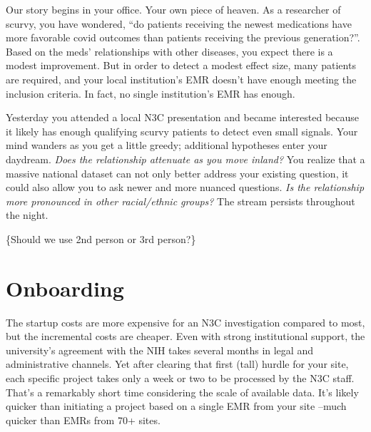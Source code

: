 \documentclass[
  letterpaper,
  DIV=11,
  numbers=noendperiod]{scrreprt}
\begin{document}
\begin{tcolorbox}[enhanced jigsaw, rightrule=.15mm, colback=white, leftrule=.75mm, breakable, left=2mm, bottomtitle=1mm, opacityback=0, toprule=.15mm, colframe=quarto-callout-note-color-frame, titlerule=0mm, toptitle=1mm, coltitle=black, title={Voice of Morgan Freeman}, bottomrule=.15mm, arc=.35mm, opacitybacktitle=0.6, colbacktitle=quarto-callout-note-color!10!white]

Our story begins in your office. Your own piece of heaven. As a
researcher of scurvy, you have wondered, ``do patients receiving the
newest medications have more favorable covid outcomes than patients
receiving the previous generation?''. Based on the meds' relationships
with other diseases, you expect there is a modest improvement. But in
order to detect a modest effect size, many patients are required, and
your local institution's EMR doesn't have enough meeting the inclusion
criteria. In fact, no single institution's EMR has enough.

Yesterday you attended a local N3C presentation and became interested
because it likely has enough qualifying scurvy patients to detect even
small signals. Your mind wanders as you get a little greedy; additional
hypotheses enter your daydream. \emph{Does the relationship attenuate as
you move inland?} You realize that a massive national dataset can not
only better address your existing question, it could also allow you to
ask newer and more nuanced questions. \emph{Is the relationship more
pronounced in other racial/ethnic groups?} The stream persists
throughout the night.

\end{tcolorbox}

\{Should we use 2nd person or 3rd person?\}

\hypertarget{sec-story-onboarding}{%
\section{Onboarding}\label{sec-story-onboarding}}

The startup costs are more expensive for an N3C investigation compared
to most, but the incremental costs are cheaper. Even with strong
institutional support, the university's agreement with the NIH takes
several months in legal and administrative channels. Yet after clearing
that first (tall) hurdle for your site, each specific project takes only
a week or two to be processed by the N3C staff. That's a remarkably
short time considering the scale of available data. It's likely quicker
than initiating a project based on a single EMR from your site --much
quicker than EMRs from 70+ sites.
\end{document}
